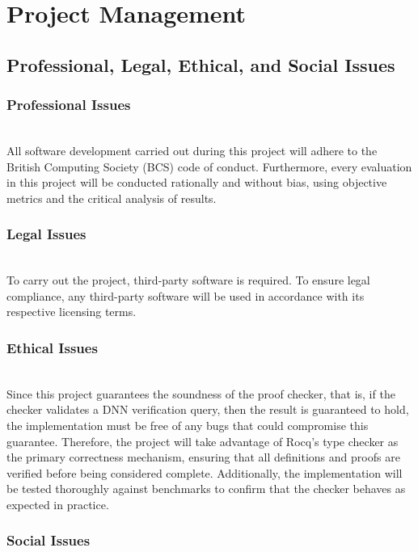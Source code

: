 \section{Project Management}

\subsection{Professional, Legal, Ethical, and Social Issues}

\subsubsection{Professional Issues} \mbox{} \\

All software development carried out during this project will adhere to the British Computing Society (BCS) code of conduct. Furthermore, every evaluation in this project will be conducted rationally and without bias, using objective metrics and the critical analysis of results.

\subsubsection{Legal Issues} \mbox{} \\

To carry out the project, third-party software is required. To ensure legal compliance, any third-party software will be used in accordance with its respective licensing terms.

\subsubsection{Ethical Issues} \mbox{} \\

Since this project guarantees the soundness of the proof checker, that is, if the checker validates a DNN verification query, then the result is guaranteed to hold, the implementation must be free of any bugs that could compromise this guarantee. Therefore, the project will take advantage of Rocq's type checker as the primary correctness mechanism, ensuring that all definitions and proofs are verified before being considered complete. Additionally, the implementation will be tested thoroughly against benchmarks to confirm that the checker behaves as expected in practice.

\subsubsection{Social Issues} \mbox{} \\

